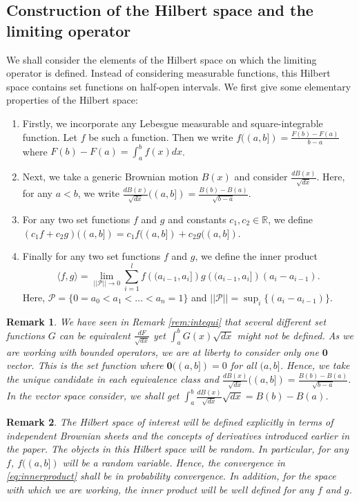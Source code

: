 \documentclass[reqno,12pt]{amsart}
\theoremstyle{plain}
\newtheorem{remark}{Remark}
\theoremstyle{definition}
\begin{document}
\subsection{Construction of the Hilbert space and the limiting operator}
We shall consider the elements of the Hilbert space on which the limiting operator is defined.
Instead of considering measurable functions, this Hilbert space contains set functions on half-open intervals.
We first give some elementary properties of the Hilbert space: 
\begin{enumerate}
\item Firstly, we incorporate any Lebesgue measurable and square-integrable function. Let $f$ be such a function. Then we write $f((a,b])= \frac{F(b)-F(a)}{b-a}$ where $F(b)-F(a)= \int_{a}^{b} f(x) dx$.
\item Next, we take a generic Brownian motion $B(x)$ and consider $\frac{dB(x)}{\sqrt{dx}}$. Here, for any $a<b$, we write $\frac{dB(x)}{\sqrt{dx}}((a,b])= \frac{B(b)-B(a)}{\sqrt{b-a}}$.
\item For any two set functions $f$ and $g$ and constants $c_{1}, c_{2} \in \mathbb{R}$, we define $(c_{1}f+c_{2}g)((a,b])= c_{1}f((a,b])+c_{2}g((a,b])$.
\item Finally for any two set functions $f$ and $g$, we define the inner product 
\begin{equation}\label{eq:innerproduct}
\langle f,g \rangle = \lim_{||\mathcal{P}|| \to 0} \sum_{i=1}^{l} f\left((a_{i-1},a_{i}]\right)g\left((a_{i-1},a_{i}]\right)(a_{i}-a_{i-1}).
\end{equation}
 Here, $\mathcal{P}= \{ 0=a_{0}<a_{1}<\ldots< a_{n}=1  \}$ and $||\mathcal{P}||= \sup_{i}\{ (a_{i}-a_{i-1}) \} $.
\end{enumerate}
\begin{remark}\label{rem:limitspace}
    We have seen in Remark \ref{rem:intequi} that several different set functions $G$ can be equivalent $\frac{dF}{\sqrt{dx}}$ yet $\int_{a}^{b} G(x)\sqrt{dx}$ might not be defined. As we are working with bounded operators, we are at liberty to consider only one $\mathbf{0}$ vector. This is the set function where $\mathbf{0}((a,b])=0$ for all $(a,b]$. Hence, we take the unique candidate in each equivalence class and $\frac{dB(x)}{\sqrt{dx}}((a,b])= \frac{B(b)-B(a)}{\sqrt{b-a}}$. In the vector space consider, we shall get $\int_{a}^{b} \frac{dB(x)}{\sqrt{dx}} \sqrt{dx}= B(b)-B(a)$. 
\end{remark}
\begin{remark}
The Hilbert space of interest will be defined \emph{explicitly} in terms of independent Brownian sheets and the concepts of derivatives introduced earlier in the paper. The objects in this Hilbert space will be random. In particular, for any $f$, $f((a,b])$ will be a random variable. Hence, the convergence in \eqref{eq:innerproduct} shall be in probability convergence. In addition, for the space with which we are working, the inner product will be well defined for any $f$ and $g$. 
\end{remark}
\end{document}
